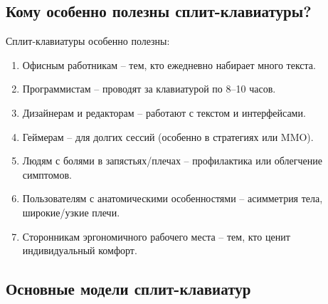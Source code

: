 \subsection{Кому особенно полезны сплит-клавиатуры?}

Сплит-клавиатуры особенно полезны:

\begin{enumerate}
\item Офисным работникам -- тем, кто ежедневно набирает много текста.
\item Программистам -- проводят за клавиатурой по 8--10 часов.
\item Дизайнерам и редакторам -- работают с текстом и интерфейсами.
\item Геймерам -- для долгих сессий (особенно в стратегиях или MMO).
\item Людям с болями в запястьях/плечах -- профилактика или облегчение симптомов.
\item Пользователям с анатомическими особенностями -- асимметрия тела, широкие/узкие плечи.
\item Сторонникам эргономичного рабочего места -- тем, кто ценит индивидуальный комфорт. 
\end{enumerate}

\subsection{Основные модели сплит-клавиатур}

